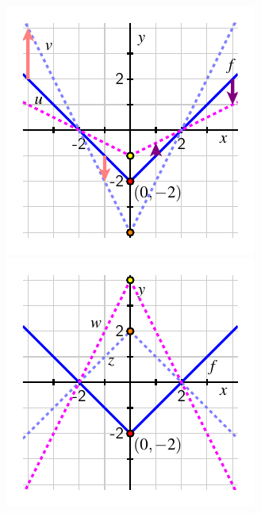 \documentclass[handout, noauthor, nooutcomes]{ximera}
\begin{document}
\begin{example}
\begin{explanation}
\begin{image}
\includegraphics[width=1\linewidth]{images/transformations-vert-stretch-1}
\includegraphics[width=1\linewidth]{images/transformations-vert-stretch-2}
\end{image}



\end{explanation}
\end{example}
\end{document}

